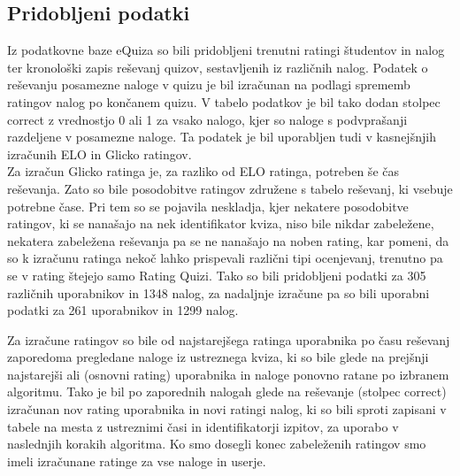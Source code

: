 \documentclass{IEEEtran}
\makeatletter
\let\old@subsection\subsection
\renewcommand{\subsection}[1]{\bigskip\old@subsection{#1}\@afterindentfalse\@afterheading}
\makeatother
\begin{document}
\subsection{Pridobljeni podatki}
Iz podatkovne baze eQuiza so bili pridobljeni trenutni ratingi študentov in nalog ter kronološki zapis reševanj quizov, sestavljenih iz različnih nalog. Podatek o reševanju posamezne naloge v quizu je bil izračunan na podlagi sprememb ratingov nalog po končanem quizu. V tabelo podatkov je bil tako dodan stolpec correct z vrednostjo 0 ali 1 za vsako nalogo, kjer so naloge s podvprašanji razdeljene v posamezne naloge. Ta podatek je bil uporabljen tudi v kasnejšnjih izračunih ELO in Glicko ratingov.
\hfill
\\
Za izračun Glicko ratinga je, za razliko od ELO ratinga, potreben še čas reševanja. Zato so bile posodobitve ratingov združene s tabelo reševanj, ki vsebuje potrebne čase. Pri tem so se pojavila neskladja, kjer nekatere posodobitve ratingov, ki se nanašajo na nek identifikator kviza, niso bile nikdar zabeležene, nekatera zabeležena reševanja pa se ne nanašajo na noben rating, kar pomeni, da so k izračunu ratinga nekoč lahko prispevali različni tipi ocenjevanj, trenutno pa se v rating štejejo samo Rating Quizi. Tako so bili pridobljeni podatki za 305 različnih uporabnikov in 1348 nalog, za nadaljnje izračune pa so bili uporabni podatki za 261 uporabnikov in 1299 nalog.

Za izračune ratingov so bile od najstarejšega ratinga uporabnika po času reševanj zaporedoma pregledane naloge iz ustreznega kviza, ki so bile glede na prejšnji najstarejši ali (osnovni rating) uporabnika in naloge ponovno ratane po izbranem algoritmu. Tako je bil po zaporednih nalogah glede na reševanje (stolpec correct) izračunan nov rating uporabnika in novi ratingi nalog, ki so bili sproti zapisani v tabele na mesta z ustreznimi časi in identifikatorji izpitov, za uporabo v naslednjih korakih algoritma. Ko smo dosegli konec zabeleženih ratingov smo imeli izračunane ratinge za vse naloge in userje.

%
\end{document}

